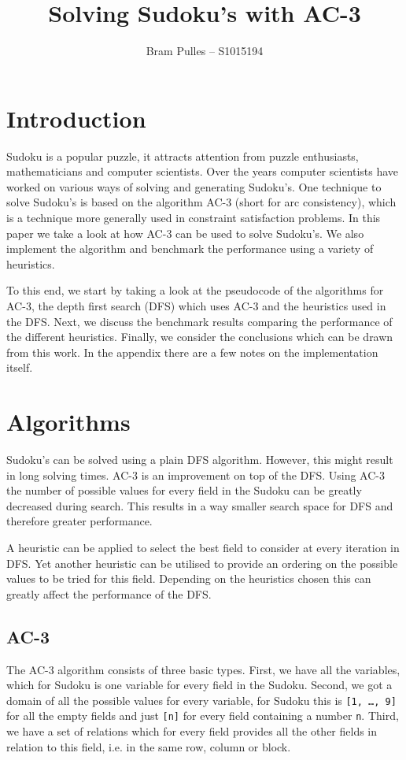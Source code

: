 \documentclass[a4paper]{article}
\author{Bram Pulles -- S1015194}
\title{\textbf{Solving Sudoku's with AC-3}}
\begin{document}
\maketitle

\tableofcontents

\pagebreak
\section{Introduction}
Sudoku is a popular puzzle, it attracts attention from puzzle enthusiasts,
mathematicians and computer scientists. Over the years computer scientists have
worked on various ways of solving and generating Sudoku's. One technique to
solve Sudoku's is based on the algorithm AC-3 (short for arc consistency),
which is a technique more generally used in constraint satisfaction problems.
In this paper we take a look at how AC-3 can be used to solve Sudoku's. We also
implement the algorithm and benchmark the performance using a variety of
heuristics.

To this end, we start by taking a look at the pseudocode of the algorithms for
AC-3, the depth first search (DFS) which uses AC-3 and the heuristics used in
the DFS. Next, we discuss the benchmark results comparing the performance of
the different heuristics. Finally, we consider the conclusions which can be
drawn from this work. In the appendix there are a few notes on the
implementation itself.

\section{Algorithms}
Sudoku's can be solved using a plain DFS algorithm. However, this might result
in long solving times. AC-3 is an improvement on top of the DFS. Using AC-3 the
number of possible values for every field in the Sudoku can be greatly
decreased during search. This results in a way smaller search space for DFS and
therefore greater performance.

A heuristic can be applied to select the best field to consider at every
iteration in DFS. Yet another heuristic can be utilised to provide an ordering
on the possible values to be tried for this field. Depending on the heuristics
chosen this can greatly affect the performance of the DFS.

\subsection{AC-3}
The AC-3 algorithm consists of three basic types. First, we have all the
variables, which for Sudoku is one variable for every field in the Sudoku.
Second, we got a domain of all the possible values for every variable, for
Sudoku this is \texttt{[1, \dots, 9]} for all the empty fields and just
\texttt{[n]} for every field containing a number \texttt{n}. Third, we have a
set of relations which for every field provides all the other fields in
relation to this field, i.e. in the same row, column or block.
\end{document}
